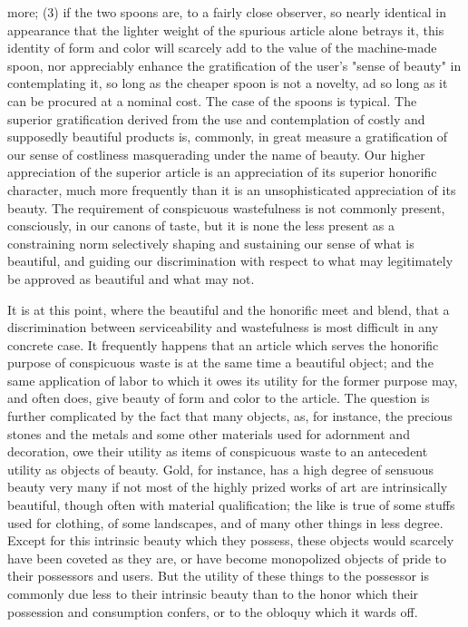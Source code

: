 \documentclass[12pt]{report}
\begin{document}
more; (3) if the two spoons are, to a fairly close observer, so nearly
identical in appearance that the lighter weight of the spurious article
alone betrays it, this identity of form and color will scarcely add
to the value of the machine-made spoon, nor appreciably enhance the
gratification of the user's "sense of beauty" in contemplating it, so
long as the cheaper spoon is not a novelty, ad so long as it can be
procured at a nominal cost. The case of the spoons is typical. The
superior gratification derived from the use and contemplation of costly
and supposedly beautiful products is, commonly, in great measure a
gratification of our sense of costliness masquerading under the name
of beauty. Our higher appreciation of the superior article is an
appreciation of its superior honorific character, much more frequently
than it is an unsophisticated appreciation of its beauty. The
requirement of conspicuous wastefulness is not commonly present,
consciously, in our canons of taste, but it is none the less present as
a constraining norm selectively shaping and sustaining our sense of what
is beautiful, and guiding our discrimination with respect to what may
legitimately be approved as beautiful and what may not.

It is at this point, where the beautiful and the honorific meet and
blend, that a discrimination between serviceability and wastefulness
is most difficult in any concrete case. It frequently happens that an
article which serves the honorific purpose of conspicuous waste is at
the same time a beautiful object; and the same application of labor to
which it owes its utility for the former purpose may, and often does,
give beauty of form and color to the article. The question is further
complicated by the fact that many objects, as, for instance, the
precious stones and the metals and some other materials used for
adornment and decoration, owe their utility as items of conspicuous
waste to an antecedent utility as objects of beauty. Gold, for instance,
has a high degree of sensuous beauty very many if not most of the highly
prized works of art are intrinsically beautiful, though often with
material qualification; the like is true of some stuffs used for
clothing, of some landscapes, and of many other things in less degree.
Except for this intrinsic beauty which they possess, these objects
would scarcely have been coveted as they are, or have become monopolized
objects of pride to their possessors and users. But the utility of these
things to the possessor is commonly due less to their intrinsic beauty
than to the honor which their possession and consumption confers, or to
the obloquy which it wards off.
\end{document}
